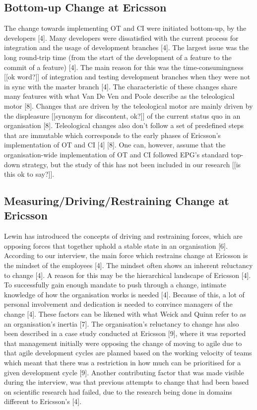 \documentclass[final_report_innit.tex]{subfiles}
\begin{document}
\subsection*{Bottom-up Change at Ericsson}
The change towards implementing OT and CI were initiated bottom-up, by the developers [4]. Many developers were dissatisfied with the current process for integration and the usage of development branches [4]. The largest issue was the long round-trip time (from the start of the development of a feature to the commit of a feature) [4]. The main reason for this was the time-consumingness [[ok word?]] of integration and testing development branches when they were not in sync with the master branch [4]. The characteristic of these changes share many features with what Van De Ven and Poole describe as the teleological motor [8]. Changes that are driven by the teleological motor are mainly driven by the displeasure [[synonym for discontent, ok?]] of the current status quo in an organisation [8]. Teleological changes also don’t follow a set of predefined steps that are immutable which corresponds to the early phases of Ericsson’s implementation of OT and CI [4] [8]. One can, however, assume that the organisation-wide implementation of OT and CI followed EPG’s standard top-down strategy, but the study of this has not been included in our research [[is this ok to say?]].

\subsection*{Measuring/Driving/Restraining Change at Ericsson}
Lewin has introduced the concepts of driving and restraining forces, which are opposing forces that together uphold a stable state in an organisation [6]. According to our interview, the main force which restrains change at Ericsson is the mindset of the employees [4]. The mindset often shows an inherent reluctancy to change [4]. A reason for this may be the hierarchical landscape of Ericsson [4]. To successfully gain enough mandate to push through a change, intimate knowledge of how the organisation works is needed [4]. Because of this, a lot of personal involvement and dedication is needed to convince managers of the change [4]. These factors can be likened with what Weick and Quinn refer to as an organisation's inertia [7]. The organisation's reluctancy to change has also been described in a case study conducted at Ericsson [9], where it was reported that management initially were opposing the change of moving to agile due to that agile development cycles are planned based on the working velocity of teams which meant that there was a restriction in how much can be prioritised for a given development cycle [9]. Another contributing factor that was made visible during the interview, was that previous attempts to change that had been based on scientific research had failed, due to the research being done in domains different to Ericsson's [4]. 
\end{document}
